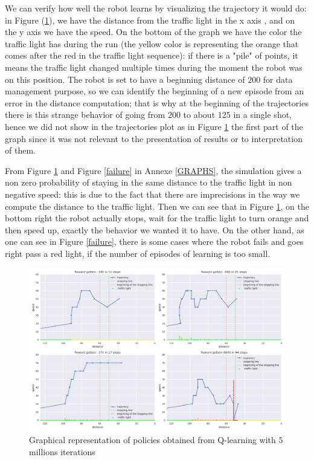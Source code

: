 \documentclass[14pt,a4paper]{article}
\theoremstyle{definition}
\begin{document}
We can verify how well the robot learns by visualizing the trajectory it would do: in Figure (\ref{trajectories}), we have the distance from the traffic light in the x axis , and on the y axis we have the speed. On the bottom of the graph we have the color the traffic light has during the run (the yellow color is representing the orange that comes after the red in the traffic light sequence): if there is a "pile" of points, it means the traffic light changed multiple times during the moment the robot was on this position. The robot is set to have a beginning distance of $200$ for data management purpose, so we can identify the beginning of a new episode from an error in the distance computation; that is why at the beginning of the trajectories there is this strange behavior of going from $200$ to about $125$ in a single shot, hence we did not show in the trajectories plot as in Figure \ref{trajectories} the first part of the graph since it was not relevant to the presentation of results or to interpretation of them.

From Figure \ref{trajectories} and Figure \ref{failure} in Annexe \ref{GRAPHS}, the simulation gives a non zero probability of staying in the same distance to the traffic light in non negative speed: this is due to the fact that there are imprecisions in the way we compute the distance to the traffic light. Then we can see that in Figure \ref{trajectories}, on the bottom right the robot actually stops, wait for the traffic light to turn orange and then speed up, exactly the behavior we wanted it to have. On the other hand, as one can see in Figure \ref{failure}, there is some cases where the robot fails and goes right pass a red light, if the number of episodes of learning is too small.

\begin{figure}[H]
\centering
\includegraphics[scale=0.4]{img/traj_5m.png}
\caption{Graphical representation of  policies obtained from Q-learning with $5$ millions  iterations}
\label{trajectories}
\end{figure}
\end{document}
